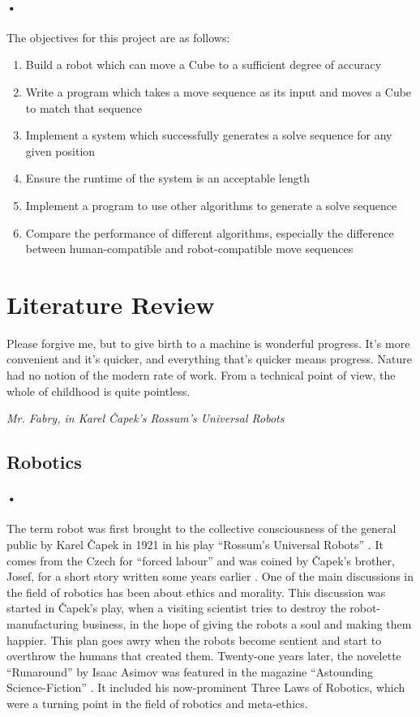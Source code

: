 \documentclass{article}
\begin{document}
\paragraph{•}
The objectives for this project are as follows:

\begin{enumerate}
\item Build a robot which can move a Cube to a sufficient degree of accuracy
\item Write a program which takes a move sequence as its input and moves a Cube to match that sequence
\item Implement a system which successfully  generates a solve sequence for any given position
\item Ensure the runtime of the system is an acceptable length
\item Implement a program to use other algorithms to generate a solve sequence
\item Compare the performance of different algorithms, especially the difference between human-compatible and robot-compatible move sequences
\end{enumerate}



\newpage
\section{Literature Review}
\epigraph{Please forgive me, but to give birth to a machine is wonderful progress. It's more convenient and it's quicker, and everything that's quicker means progress. Nature had no notion of the modern rate of work. From a technical point of view, the whole of childhood is quite pointless.}{\textit{Mr. Fabry, in Karel \v{C}apek's Rossum's Universal Robots}}

\subsection{Robotics}
\paragraph{•}
The term robot was first brought to the collective consciousness of the general public by Karel \v{C}apek in 1921 in his play \enquote{Rossum's Universal Robots} \cite{Capek1921b}. It comes from the Czech for \enquote{forced labour} and was coined by \v{C}apek's brother, Josef, for a short story written some years earlier \cite{Etymonline2017}. One of the main discussions in the field of robotics has been about ethics and morality. This discussion was started in \v{C}apek's play, when a visiting scientist tries to destroy the robot-manufacturing business, in the hope of giving the robots a soul and making them happier. This plan goes awry when the robots become sentient and start to overthrow the humans that created them. Twenty-one years later, the novelette \enquote{Runaround} by Isaac Asimov was featured in the magazine \enquote{Astounding Science-Fiction} \cite{Asimov1942b}. It included his now-prominent Three Laws of Robotics, which were a turning point in the field of robotics and meta-ethics. 
\end{document}
